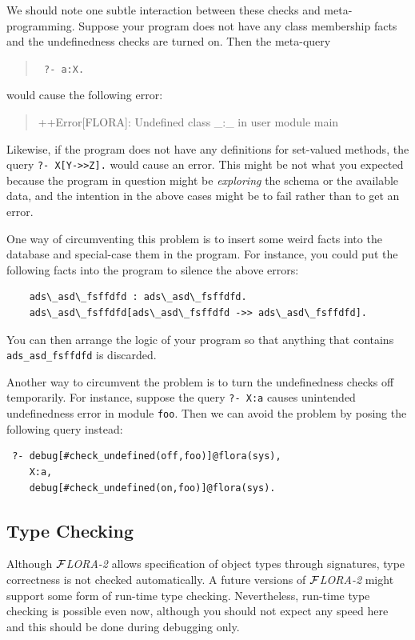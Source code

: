 \documentclass[11pt]{article}
\newcommand{\FLORA}{{\mbox{${\cal F}${\small\it LORA}\rm\emph{-2}}}\xspace}
\begin{document}
We should note one subtle interaction between these checks and
meta-programming. Suppose your program does not have any class membership
facts and the undefinedness checks are turned on. Then the meta-query
\begin{quote}
 {\tt
 ?- a:X.
 }
\end{quote}
would cause the following error:
\begin{quote}
 ++Error[FLORA]: Undefined class \_:\_ in user module main  
\end{quote}
Likewise, if the program does not have any definitions for set-valued
methods, the query {\tt ?- X[Y->>Z].} would cause an error. This might be
not what you expected because the program in question might be
\emph{exploring} the schema or the available data, and the intention in the
above cases might be to fail rather than to get an error.

One way of circumventing this problem is to insert some weird facts into the
database and special-case them in the program. For instance, you could put
the following facts into the program to silence the above errors:
\begin{verbatim}
    ads\_asd\_fsffdfd : ads\_asd\_fsffdfd.
    ads\_asd\_fsffdfd[ads\_asd\_fsffdfd ->> ads\_asd\_fsffdfd].
\end{verbatim}
You can then arrange the logic of your program so that anything that contains
{\tt ads\_asd\_fsffdfd} is discarded.

Another way to circumvent  the problem is to turn the undefinedness checks
off temporarily. For instance, suppose the query {\tt ?- X:a} causes
unintended undefinedness error in module {\tt foo}. Then we can avoid the
problem by posing the following query instead:
\begin{verbatim}
 ?- debug[#check_undefined(off,foo)]@flora(sys),
    X:a,
    debug[#check_undefined(on,foo)]@flora(sys).
\end{verbatim}

\subsection{Type Checking}\label{sec-typechecking}

Although \FLORA allows specification of object types through signatures,
type correctness is not checked automatically.
A future versions of \FLORA might support some form of run-time type
checking. Nevertheless, run-time type checking is possible even now,
although you should not expect any speed here and this should be done
during debugging only.
\end{document}
